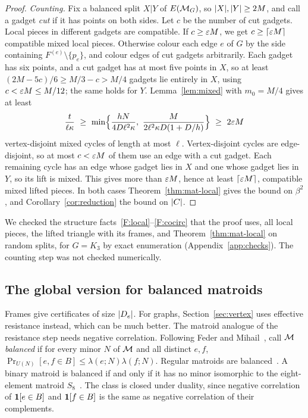 \begin{proof}
\emph{Counting.} Fix a balanced split $X|Y$ of $E(\mathcal{M}_G)$, so $\lvert X\rvert,\lvert Y\rvert\ge2M$, and call a gadget \emph{cut} if it has points on both sides. Let $c$ be the number of cut gadgets. Local pieces in different gadgets are compatible. If $c\ge\varepsilon M$, we get $c\ge\lceil\varepsilon M\rceil$ compatible mixed local pieces. Otherwise colour each edge $e$ of $G$ by the side containing $F^{(e)}\setminus\{p_e\}$, and colour edges of cut gadgets arbitrarily. Each gadget has six points, and a cut gadget has at most five points in $X$, so at least $(2M-5c)/6\ge M/3-c>M/4$ gadgets lie entirely in $X$, using $c<\varepsilon M\le M/12$; the same holds for $Y$. Lemma~\ref{lem:mixed} with $m_0=M/4$ gives at least
\[
  \frac t{\ell\kappa}\ \ge\ \min\Bigl\{\frac{hN}{4D\ell^2\kappa},\ \frac M{2\ell^2\kappa D(1+D/h)}\Bigr\}\ \ge\ 2\eps M
\]
vertex-disjoint mixed cycles of length at most $\ell$. Vertex-disjoint cycles are edge-disjoint, so at most $c<\varepsilon M$ of them use an edge with a cut gadget. Each remaining cycle has an edge whose gadget lies in $X$ and one whose gadget lies in $Y$, so its lift is mixed. This gives more than $\varepsilon M$, hence at least $\lceil\varepsilon M\rceil$, compatible mixed lifted pieces. In both cases Theorem~\ref{thm:mat-local} gives the bound on $\beta^2$, and Corollary~\ref{cor:reduction} the bound on $\lvert C\rvert$.
\end{proof}

We checked the structure facts~\ref{F:local}--\ref{F:cocirc} that the proof uses, all local pieces, the lifted triangle with its frames, and Theorem~\ref{thm:mat-local} on random splits, for $G=K_3$ by exact enumeration (Appendix~\ref{app:checks}). The counting step was not checked numerically.

\subsection{The global version for balanced matroids}

Frames give certificates of size $\lvert D_e\rvert$. For graphs, Section~\ref{sec:vertex} uses effective resistance instead, which can be much better. The matroid analogue of the resistance step needs negative correlation. Following Feder and Mihail~\cite{FederMihail92}, call $\mathcal{M}$ \emph{balanced} if for every minor $N$ of $\mathcal{M}$ and all distinct $e,f$, $\Pr_{U(N)}[e,f\in B]\le\lambda(e;N)\lambda(f;N)$. Regular matroids are balanced~\cite{FederMihail92}. A binary matroid is balanced if and only if it has no minor isomorphic to the eight-element matroid $S_8$~\cite{ChoeWagner03}. The class is closed under duality, since negative correlation of $\mathbf{1}[e\in B]$ and $\mathbf{1}[f\in B]$ is the same as negative correlation of their complements.

